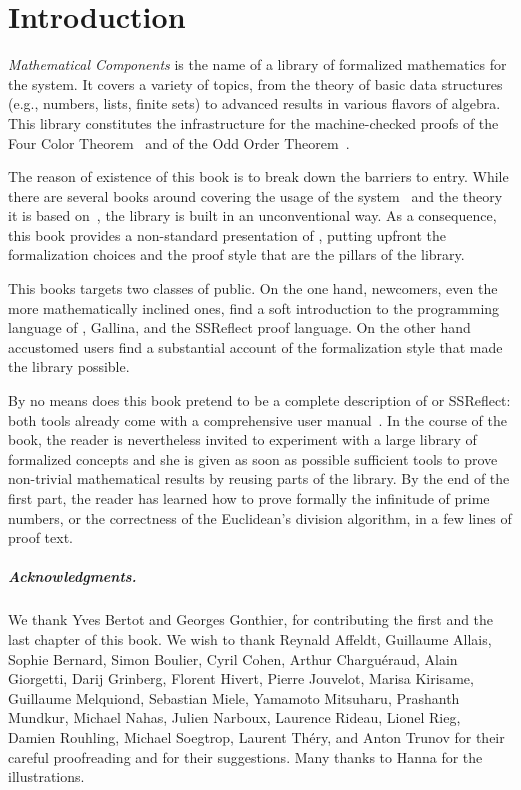 \chapter*{Introduction}

\emph{Mathematical Components}
is the name of a library of formalized mathematics for the
\Coq{} system.  It covers a variety of
topics, from the theory of basic data structures (e.g., numbers, lists, finite
sets) to advanced results in various flavors of algebra. This library
constitutes the infrastructure for the machine-checked proofs of the
Four Color Theorem~\cite{Gonthier08} and of the
Odd Order Theorem~\cite{gonthier:hal-00816699}.

The reason of existence of this book is to break down the barriers to entry.
While there are several books around covering the usage of the
\Coq{} system~\cite{BC04,SF,CPDT}
and the theory it is based
on~\cite{Coq:manual}\cite{paulinmohring:hal-01094195,hottbook},
the \mcbMC{} library is built
in an unconventional way.  As a consequence, this book provides a
non-standard presentation of \Coq{}, putting upfront the formalization
choices and the proof style that are the pillars of the library.

This books targets two classes of public.  On the one hand, newcomers,
even the more mathematically inclined ones, %
find a soft
introduction to the programming
language of \Coq{}, Gallina, and the SSReflect proof language.
On the other hand accustomed \Coq{} users %
find a
substantial account of the formalization style that made the \mcbMC{}
library possible.


By no means does this book pretend to be a complete description of \Coq{} or
SSReflect: both tools already come with a comprehensive user
manual~\cite{Coq:manual,ssrman}.
In the course of the book, the reader is nevertheless invited to
experiment with  a large library of formalized concepts and she is
given as soon as possible sufficient tools to prove non-trivial
mathematical results by reusing parts of the library. By the end of
the first part, the reader has learned how to prove formally the
infinitude of prime numbers, or the correctness of the Euclidean's
division algorithm, in a few lines of proof text.

\paragraph{Acknowledgments.}
We thank Yves Bertot and Georges Gonthier, for contributing the first
and the last chapter of this book. We wish to thank Reynald Affeldt,
Guillaume Allais, Sophie Bernard, Simon Boulier, Cyril Cohen, Arthur
Charguéraud, Alain Giorgetti, Darij Grinberg, Florent Hivert, Pierre
Jouvelot, Marisa Kirisame, Guillaume Melquiond, Sebastian Miele,
Yamamoto Mitsuharu, Prashanth Mundkur, Michael Nahas, Julien Narboux,
Laurence Rideau, Lionel Rieg, Damien Rouhling, Michael Soegtrop,
Laurent Théry, and Anton Trunov for their careful proofreading and for
their suggestions. Many thanks to Hanna for the illustrations.

